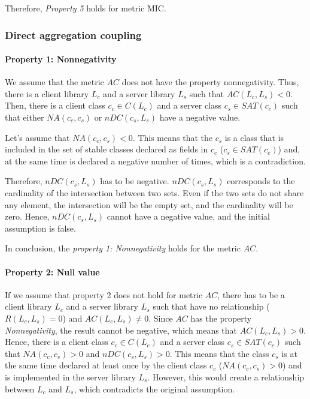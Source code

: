 Therefore, \textit{Property 5} holds for metric MIC.

\subsubsection{Direct aggregation coupling}
\paragraph{Property 1: Nonnegativity}
We assume that the metric $AC$ does not have the property nonnegativity. Thus, there is a client library $L_c$ and a server library $L_s$ such that $AC(L_c, L_s) < 0$. Then, there is a client class $c_c \in C(L_c)$ and a server class $c_s \in SAT(c_c)$ such that either $NA(c_c, c_s)$ or $nDC(c_s, L_s)$ have a negative value.

Let's assume that $NA(c_c, c_s) < 0$. This means that the $c_s$ is a class that is included in the set of stable classes declared as fields in $c_c$ ($c_s \in SAT(c_c)$) and, at the same time is declared a negative number of times, which is a contradiction.

Therefore, $nDC(c_s, L_s)$ has to be negative. $nDC(c_s, L_s)$ corresponds to the cardinality of the intersection between two sets. Even if the two sets do not share any element, the intersection will be the empty set, and the cardinality will be zero. Hence, $nDC(c_s, L_s)$ cannot have a negative value, and the initial assumption is false.

In conclusion, the \textit{property 1: Nonnegativity} holds for the metric $AC$.

\paragraph{Property 2: Null value}
If we assume that property 2 does not hold for metric $AC$, there has to be a client library $L_c$ and a server library $L_s$ such that have no relationship ($R(L_c, L_s) = 0$) and $AC(L_c, L_s)	\neq 0$. Since $AC$ has the property \textit{Nonnegativity}, the result cannot be negative, which means that $AC(L_c, L_s) > 0$. Hence, there is a client class $c_c \in C(L_c)$ and a server class $c_s \in SAT(c_c)$ such that $NA(c_c, c_s) > 0$ and $nDC(c_s, L_s) > 0$. This means that the class $c_s$ is at the same time declared at least once by the client class $c_c$ ($NA(c_c, c_s) > 0$) and is implemented in the server library $L_s$. However, this would create a relationship between $L_c$ and $L_s$, which contradicts the original assumption.

